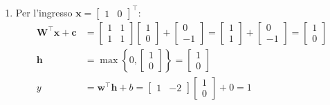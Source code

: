 ﻿\documentclass[11pt, a4paper]{article}
\begin{document}
\begin{enumerate}
    \item Per l'ingresso $\bm{x} = \begin{bmatrix} 1 & 0 \end{bmatrix}^\top$:
    \begin{align*}
    \bm{W}^\top \bm{x} + \bm{c} &= \begin{bmatrix} 1 & 1 \\ 1 & 1 \end{bmatrix} \begin{bmatrix} 1 \\ 0 \end{bmatrix} + \begin{bmatrix} 0 \\ -1 \end{bmatrix} = \begin{bmatrix} 1 \\ 1 \end{bmatrix} + \begin{bmatrix} 0 \\ -1 \end{bmatrix} = \begin{bmatrix} 1 \\ 0 \end{bmatrix} \\
    \bm{h} &= \max\left\{0, \begin{bmatrix} 1 \\ 0 \end{bmatrix}\right\} = \begin{bmatrix} 1 \\ 0 \end{bmatrix} \\
    y &= \bm{w}^\top \bm{h} + b = \begin{bmatrix} 1 & -2 \end{bmatrix} \begin{bmatrix} 1 \\ 0 \end{bmatrix} + 0 = \boxed{1}
    \end{align*}


\end{enumerate}
\end{document}
